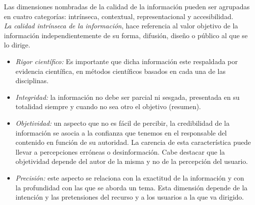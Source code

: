 Las dimensiones nombradas de la calidad de la informaci\'on pueden ser agrupadas en cuatro categor\'ias: intr\'inseca, contextual, representacional y accesibilidad. \\

\emph{La calidad intr\'inseca de la informaci\'on}, hace referencia al valor objetivo de la informaci\'on independientemente de su forma, difusi\'on, dise\~no o p\'ublico al que se lo dirige.
\begin{itemize}
\item \emph{Rigor cient\'ifico:} Es importante que dicha informaci\'on este respaldada por evidencia cient\'ifica, en m\'etodos cient\'ificos basados en cada una de las disciplinas.
\item \emph{Integridad:} la informaci\'on no debe ser parcial ni sesgada, presentada en su totalidad siempre y cuando no sea otro el objetivo (resumen).
\item \emph{Objetividad:} un aspecto que no es f\'acil de percibir, la credibilidad de la informaci\'on se asocia a la confianza que tenemos en el responsable del contenido en funci\'on de su autoridad. La carencia de esta caracter\'istica puede llevar a percepciones err\'oneas o desinformaci\'on. Cabe destacar que la objetividad depende del autor de la misma y no de la percepci\'on del usuario.
\item \emph{Precisi\'on:} este aspecto se relaciona con la exactitud de la informaci\'on y con la profundidad con las que se aborda un tema. Esta dimensi\'on depende de la intenci\'on y las pretensiones del recurso y a los usuarios a la que va dirigido.
\end{itemize}


